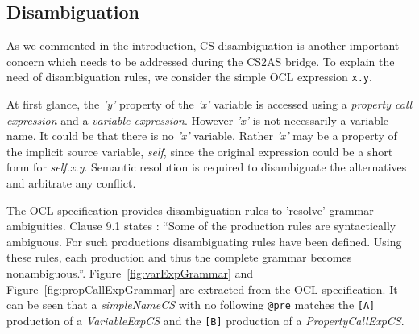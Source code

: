 \documentclass{llncs}
\begin{document}


\subsection{Disambiguation}
\label{subsec:disamb}

As we commented in the introduction, CS disambiguation is another important concern which needs to be addressed during the CS2AS bridge. To explain the need of disambiguation rules, we consider the simple OCL expression \verb$x.y$.

At first glance, the \emph{'y'} property of the \emph{'x'} variable is accessed using a \textit{property call expression} and a \textit{variable expression}. However \emph{'x'} is not necessarily a variable name. It could be that there is no \emph{'x'} variable. Rather \emph{'x'} may be a property of the implicit source variable, \emph{self}, since the original expression could be a short form for \emph{self.x.y}. Semantic resolution is required to disambiguate the alternatives and arbitrate any conflict.

The OCL specification provides disambiguation rules to 'resolve' grammar ambiguities. Clause 9.1 states : ``Some of the production rules are syntactically ambiguous. For such productions disambiguating rules have been defined. Using these rules, each production and thus the complete grammar becomes nonambiguous.''. Figure~\ref{fig:varExpGrammar} and Figure~\ref{fig:propCallExpGrammar} are extracted from the OCL specification. It can be seen that a \emph{simpleNameCS} with no following \verb$@pre$ matches the \verb$[A]$ production of a \emph{VariableExpCS} and the \verb$[B]$ production of a \emph{PropertyCallExpCS}. 
\end{document}
